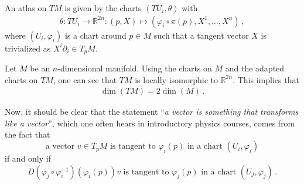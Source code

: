 

    \begin{property}
        An atlas on $TM$ is given by the charts $(TU_i,\theta)$ with
        \begin{gather}
            \theta:TU_i\rightarrow\mathbb{R}^{2n}:(p,X)\mapsto(\varphi_i\circ\pi(p),X^1,\ldots,X^n)\,,
        \end{gather}
        where $(U_i,\varphi_i)$ is a chart around $p\in M$ such that a tangent vector $X$ is trivialized as $X^i\partial_i\in T_pM$.
    \end{property}

    \begin{property}[Dimension]
        Let $M$ be an $n$-dimensional manifold. Using the charts on $M$ and the adapted charts on $TM$, one can see that $TM$ is locally isomorphic to $\mathbb{R}^{2n}$. This implies that
        \begin{gather}
            \dim(TM) = 2\dim(M)\,.
        \end{gather}
    \end{property}

    \begin{remark}[Physics]
        Now, it should be clear that the statement ``\textit{a vector is something that transforms like a vector}'', which one often hears in introductory physics courses, comes from the fact that \[\text{a vector }v\in T_pM\text{ is tangent to }\varphi_i(p)\text{ in a chart }(U_i,\varphi_i)\] if and only if \[D(\varphi_j\circ\varphi_i^{-1})(\varphi_i(p))v\text{ is tangent to }\varphi_j(p)\text{ in a chart }(U_j,\varphi_j)\,.\]
    \end{remark}

